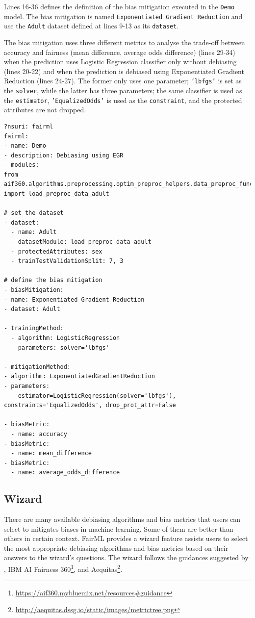 \documentclass[sigconf,review]{acmart}
\begin{document}
Lines 16-36 defines the definition of the bias mitigation executed in the \texttt{Demo} model. The bias mitigation is named \texttt{Exponentiated Gradient Reduction} and use the \texttt{Adult} dataset defined at lines 9-13 as its \texttt{dataset}. 

The bias mitigation uses three different metrics to analyse the trade-off between accuracy and fairness (mean difference, average odds difference) (lines 29-34) when the prediction uses Logistic Regression classifier only without debiasing (lines 20-22) and when the prediction is debiased using Exponentiated Gradient Reduction (lines 24-27). The former only uses one parameter; \texttt{'lbfgs'} is set as the \texttt{solver}, while the latter has three parameters; the same classifier is used as the \texttt{estimator}, \texttt{'EqualizedOdds'} is used as the \texttt{constraint}, and the protected attributes are not dropped.

\begin{lstlisting}[firstnumber=1,style=yaml,caption={Bias mitigation using  Demo Exponentiated Gradient Reduction  expressed in YAML.},label=lst:fairml_model]
?nsuri: fairml
fairml:
- name: Demo
- description: Debiasing using EGR
- modules: 
from aif360.algorithms.preprocessing.optim_preproc_helpers.data_preproc_functions import load_preproc_data_adult

# set the dataset
- dataset:
  - name: Adult
  - datasetModule: load_preproc_data_adult
  - protectedAttributes: sex
  - trainTestValidationSplit: 7, 3

# define the bias mitigation
- biasMitigation:
- name: Exponentiated Gradient Reduction  
- dataset: Adult

- trainingMethod:
  - algorithm: LogisticRegression
  - parameters: solver='lbfgs'

- mitigationMethod:
- algorithm: ExponentiatedGradientReduction
- parameters: 
    estimator=LogisticRegression(solver='lbfgs'), constraints='EqualizedOdds', drop_prot_attr=False

- biasMetric:
  - name: accuracy
- biasMetric:
  - name: mean_difference
- biasMetric:
  - name: average_odds_difference
\end{lstlisting}


\subsection{Wizard}
\label{sec:wizard}
There are many available debiasing algorithms and bias metrics that users can select to mitigates biases in machine learning. Some of them are better than others in certain context. FairML provides a wizard feature assists users to select the most appropriate debiasing algorithms and bias metrics based on their answers to the wizard's questions. The wizard follows the guidances suggested by \cite{mahoney2020ai}, IBM AI Fairness 360\footnote{\url{https://aif360.mybluemix.net/resources\#guidance}}, and Aequitas\footnote{\url{http://aequitas.dssg.io/static/images/metrictree.png}}.
\end{document}
